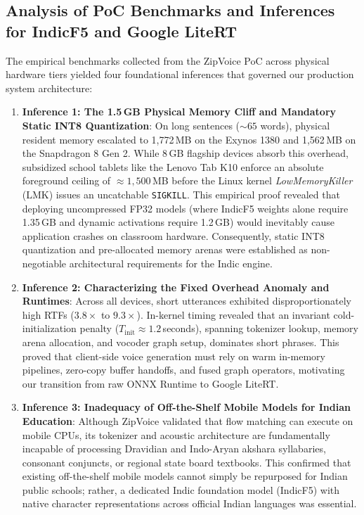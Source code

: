 \subsection{Analysis of PoC Benchmarks and Inferences for IndicF5 and Google LiteRT}
The empirical benchmarks collected from the ZipVoice PoC across physical hardware tiers yielded four foundational inferences that governed our production system architecture:
\begin{enumerate}
    \item \textbf{Inference 1: The 1.5\,GB Physical Memory Cliff and Mandatory Static INT8 Quantization}:
    On long sentences ($\sim 65$ words), physical resident memory escalated to 1,772\,MB on the Exynos 1380 and 1,562\,MB on the Snapdragon 8 Gen 2. While 8\,GB flagship devices absorb this overhead, subsidized school tablets like the Lenovo Tab K10 enforce an absolute foreground ceiling of $\approx 1,500$\,MB before the Linux kernel \textit{LowMemoryKiller} (LMK) issues an uncatchable \texttt{SIGKILL}. This empirical proof revealed that deploying uncompressed FP32 models (where IndicF5 weights alone require 1.35\,GB and dynamic activations require 1.2\,GB) would inevitably cause application crashes on classroom hardware. Consequently, static INT8 quantization and pre-allocated memory arenas were established as non-negotiable architectural requirements for the Indic engine.
    
    \item \textbf{Inference 2: Characterizing the Fixed Overhead Anomaly and Runtimes}:
    Across all devices, short utterances exhibited disproportionately high RTFs ($3.8\times$ to $9.3\times$). In-kernel timing revealed that an invariant cold-initialization penalty ($T_{\text{init}} \approx 1.2$\,seconds), spanning tokenizer lookup, memory arena allocation, and vocoder graph setup, dominates short phrases. This proved that client-side voice generation must rely on warm in-memory pipelines, zero-copy buffer handoffs, and fused graph operators, motivating our transition from raw ONNX Runtime to Google LiteRT.
    
    \item \textbf{Inference 3: Inadequacy of Off-the-Shelf Mobile Models for Indian Education}:
    Although ZipVoice validated that flow matching can execute on mobile CPUs, its tokenizer and acoustic architecture are fundamentally incapable of processing Dravidian and Indo-Aryan akshara syllabaries, consonant conjuncts, or regional state board textbooks. This confirmed that existing off-the-shelf mobile models cannot simply be repurposed for Indian public schools; rather, a dedicated Indic foundation model (IndicF5) with native character representations across official Indian languages was essential.
    

\end{enumerate}
